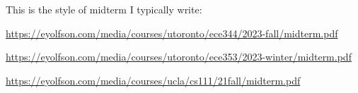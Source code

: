   \begin{slide}
    

    This is the style of midterm I typically write:

    \small
    \url{https://eyolfson.com/media/courses/utoronto/ece344/2023-fall/midterm.pdf}

    \url{https://eyolfson.com/media/courses/utoronto/ece353/2023-winter/midterm.pdf}

    \url{https://eyolfson.com/media/courses/ucla/cs111/21fall/midterm.pdf}

  \end{slide}


